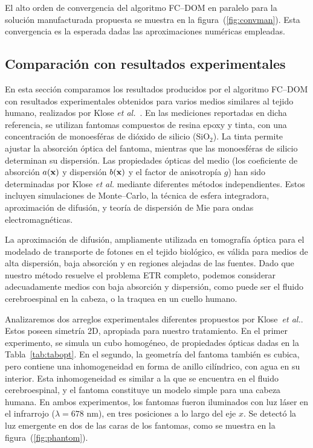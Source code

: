 El alto orden de convergencia del algoritmo FC--DOM en paralelo 
para la solución manufacturada propuesta se muestra en la figura~(\ref{fig:convman}). 
Esta convergencia es la esperada dadas las aproximaciones 
numéricas empleadas.
\subsection{Comparación con resultados experimentales}
\label{sec:resexp}

En esta sección comparamos los resultados producidos por el algoritmo FC--DOM 
con resultados experimentales obtenidos para varios 
medios similares al tejido humano, realizados por Klose \textit{et al.}~\cite{Klose2002}. 
En las mediciones reportadas en dicha referencia, 
se utilizan fantomas compuestos de resina epoxy y tinta, 
con una concentración de monoesféras de dióxido de silicio ($\text{SiO}_2$). 
La tinta permite ajustar la absorción óptica del fantoma, 
mientras que las monoesféras de silicio determinan su dispersión. 
Las propiedades ópticas del medio (los coeficiente de absorción $a(\mathbf{x})$
y dispersión $b(\mathbf{x})$ y el 
factor de anisotropía $g$) han sido determinadas por Klose \textit{et al.} mediante 
diferentes métodos independientes. Estos incluyen simulaciones de Monte--Carlo, 
la técnica de esfera integradora, aproximación de difusión, y teoría de 
dispersión de Mie para ondas electromagnéticas. 

La aproximación de difusión, ampliamente utilizada en tomografía óptica para el 
modelado de transporte de fotones en el tejido biológico, 
es válida para medios de alta dispersión,  
baja absorción y en regiones alejadas de las fuentes.
Dado que nuestro método resuelve el problema ETR completo, podemos considerar adecuadamente 
medios con baja absorción y dispersión, como puede ser el fluido cerebroespinal 
en la cabeza, o la traquea en un cuello humano. 

Analizaremos dos arreglos experimentales diferentes propuestos por Klose~\textit{et al.}. 
Estos poseen simetría 2D, apropiada para nuestro tratamiento. 
 En el primer experimento, se simula un cubo homogéneo, de propiedades ópticas dadas en 
 la Tabla~\ref{tab:tabopt}.
 En el segundo, la geometría del fantoma también 
 es cubica, pero contiene una inhomogeneidad en forma 
 de anillo cilíndrico, con agua en su interior. Esta inhomogeneidad 
 es similar a la que se encuentra en 
 el fluido cerebroespinal, y el fantoma constituye un modelo 
 simple para una cabeza humana. En ambos experimentos,
los fantomas fueron iluminados con luz láser en el 
infrarrojo ($\lambda = 678$ nm), en tres posiciones a lo largo del eje $x$. Se detectó la luz emergente 
en dos de las caras de los fantomas, como se muestra en la figura~(\ref{fig:phantom}).

